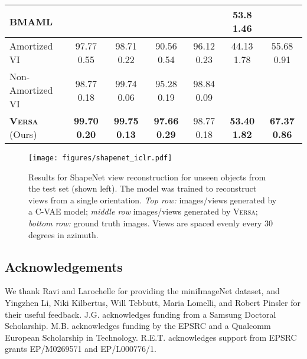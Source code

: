 \documentclass{article}
\newcommand{\Versa}{\textsc{Versa}}
\begin{document}
\begin{table}[h]
{{\begin{tabular}{ p{40mm} c c c c c c}
 BMAML \newline \citep{kim2018bayesian}                     & & & & & \textbf{53.8  1.46} & \\
 \midrule
 Amortized VI           & 97.77  0.55 & 98.71  0.22 & 90.56  0.54 & 96.12  0.23 & 44.13  1.78 & 55.68  0.91  \\
 Non-Amortized VI       & 98.77  0.18 & 99.74  0.06 & 95.28  0.19 & 98.84  0.09 &  & \\
 \textbf{\Versa{}} (Ours)     & \textbf{99.70  0.20} & \textbf{99.75  0.13} & \textbf{97.66  0.29} & 98.77  0.18 & \textbf{53.40  1.82} & \textbf{67.37  0.86} \\
 \bottomrule
\end{tabular}}
}
\end{table}
\clearpage



\newpage
\begin{figure}
    \centering
    \texttt{[image: figures/shapenet\_iclr.pdf]}
    \caption{Results for ShapeNet view reconstruction for unseen objects from the test set (shown left). The model was trained to reconstruct views from a single orientation. \textit{Top row:} images/views generated by a C-VAE model; \textit{middle row} images/views generated by \Versa{}; \textit{bottom row:} ground truth images. Views are spaced evenly every 30 degrees in azimuth.}
    \label{fig:shapenet}
\end{figure}
\clearpage

\newpage
\subsection*{Acknowledgements}
We thank Ravi and Larochelle for providing the miniImageNet dataset, and Yingzhen Li, Niki Kilbertus, Will Tebbutt, Maria Lomelli, and Robert Pinsler for their useful feedback. J.G. acknowledges funding from a Samsung Doctoral Scholarship. M.B. acknowledges funding by the EPSRC and a Qualcomm European Scholarship in Technology. R.E.T. acknowledges support from EPSRC grants EP/M0269571 and EP/L000776/1. 









\newpage
\appendix

\renewcommand\thefigure{\thesection.\arabic{figure}} 
\renewcommand\thetable{\thesection.\arabic{table}} 
\renewcommand\theequation{\thesection.\arabic{equation}} 
\end{document}
